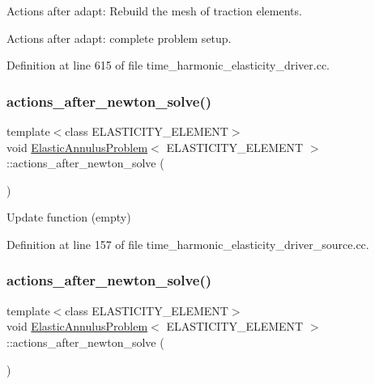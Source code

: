 Actions after adapt\+: Rebuild the mesh of traction elements. 

Actions after adapt\+: complete problem setup. 

Definition at line 615 of file time\+\_\+harmonic\+\_\+elasticity\+\_\+driver.\+cc.

\mbox{\label{classElasticAnnulusProblem_adfb87876ac9981899c6c0b4caf0786f9}} 
\subsubsection{\texorpdfstring{actions\+\_\+after\+\_\+newton\+\_\+solve()}{actions\_after\_newton\_solve()}\hspace{0.1cm}{\footnotesize\ttfamily [1/2]}}
{\footnotesize\ttfamily template$<$class E\+L\+A\+S\+T\+I\+C\+I\+T\+Y\+\_\+\+E\+L\+E\+M\+E\+NT$>$ \\
void \hyperlink{classElasticAnnulusProblem}{Elastic\+Annulus\+Problem}$<$ E\+L\+A\+S\+T\+I\+C\+I\+T\+Y\+\_\+\+E\+L\+E\+M\+E\+NT $>$\+::actions\+\_\+after\+\_\+newton\+\_\+solve (\begin{DoxyParamCaption}{ }\end{DoxyParamCaption})\hspace{0.3cm}{\ttfamily [inline]}}



Update function (empty) 



Definition at line 157 of file time\+\_\+harmonic\+\_\+elasticity\+\_\+driver\+\_\+source.\+cc.

\mbox{\label{classElasticAnnulusProblem_adfb87876ac9981899c6c0b4caf0786f9}} 
\subsubsection{\texorpdfstring{actions\+\_\+after\+\_\+newton\+\_\+solve()}{actions\_after\_newton\_solve()}\hspace{0.1cm}{\footnotesize\ttfamily [2/2]}}
{\footnotesize\ttfamily template$<$class E\+L\+A\+S\+T\+I\+C\+I\+T\+Y\+\_\+\+E\+L\+E\+M\+E\+NT$>$ \\
void \hyperlink{classElasticAnnulusProblem}{Elastic\+Annulus\+Problem}$<$ E\+L\+A\+S\+T\+I\+C\+I\+T\+Y\+\_\+\+E\+L\+E\+M\+E\+NT $>$\+::actions\+\_\+after\+\_\+newton\+\_\+solve (\begin{DoxyParamCaption}{ }\end{DoxyParamCaption})\hspace{0.3cm}{\ttfamily [inline]}}



